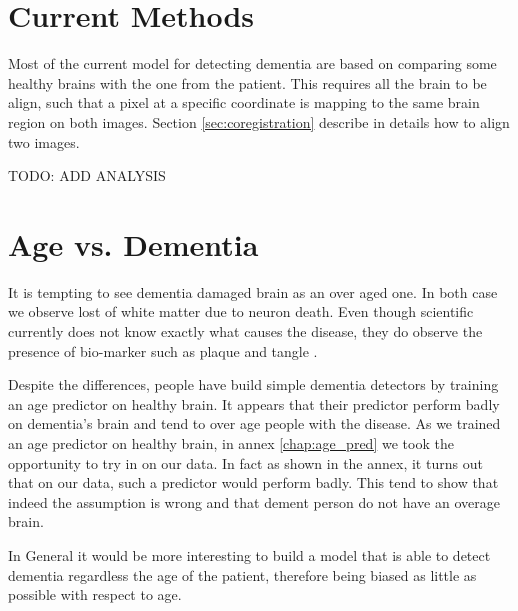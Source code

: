\section{Current Methods}
Most of the current model for detecting dementia are based on comparing some healthy brains with the one from the patient. This requires all the brain to be align, such that a pixel at a specific coordinate is mapping to the same brain region on both images. Section \ref{sec:coregistration} describe in details how to align two images.

TODO: ADD ANALYSIS


\section{Age vs. Dementia}

It is tempting to see dementia damaged brain as an over aged one. In both case we observe lost of white matter due to neuron death. Even though scientific currently does not know exactly what causes the disease, they do observe the presence of bio-marker such as plaque and tangle \cite{alzheimer_past_present_future}.

Despite the differences, people have build simple dementia detectors by training an age predictor on healthy brain. It appears that their predictor perform badly on dementia's brain and tend to over age people with the disease. As we trained an age predictor on healthy brain, in annex \ref{chap:age_pred} we took the opportunity to try in on our data. In fact as shown in the annex, it turns out that on our data, such a predictor would perform badly. This tend to show that indeed the assumption is wrong and that dement person do not have an overage brain.

In General it would be more interesting to build a model that is able to detect dementia regardless the age of the patient, therefore being biased as little as possible with respect to age.